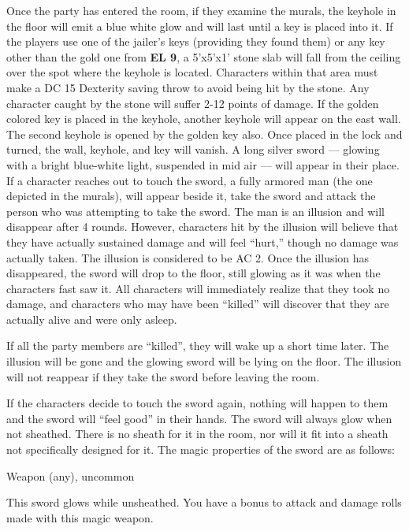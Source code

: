 \documentclass[palace_of_the_silver_princess]{subfiles}
\begin{document}
Once the party has entered the room, if they examine the murals, the
keyhole in the floor will emit a blue white glow and will last until a
key is placed into it. If the players use one of the jailer's keys
(providing they found them) or any key other than the gold one from
\textbf{EL 9}, a 5’x5’x1’ stone slab will fall from the ceiling over the
spot where the keyhole is located. Characters within that area must make
a DC 15 Dexterity saving throw to avoid being hit by the stone. Any
character caught by the stone will suffer 2-12 points of damage. If the
golden colored key is placed in the keyhole, another keyhole will appear
on the east wall. The second keyhole is opened by the golden key also.
Once placed in the lock and turned, the wall, keyhole, and key will
vanish. A long silver sword — glowing with a bright blue-white light,
suspended in mid air — will appear in their place. If a character
reaches out to touch the sword, a fully armored man (the one depicted in
the murals), will appear beside it, take the sword and attack the person
who was attempting to take the sword. The man is an illusion and will
disappear after 4 rounds. However, characters hit by the illusion will
believe that they have actually sustained damage and will feel “hurt,”
though no damage was actually taken. The illusion is considered to be AC
2. Once the illusion has disappeared, the sword will drop to the floor,
still glowing as it was when the characters fast saw it. All characters
will immediately realize that they took no damage, and characters who
may have been “killed” will discover that they are actually alive and
were only asleep.

If all the party members are “killed”, they will wake up a short time
later. The illusion will be gone and the glowing sword will be lying on
the floor. The illusion will not reappear if they take the sword before
leaving the room.

If the characters decide to touch the sword again, nothing will happen
to them and the sword will “feel good” in their hands. The sword will
always glow when not sheathed. There is no sheath for it in the room,
nor will it fit into a sheath not specifically designed for it. The
magic properties of the sword are as follows:

{Weapon (any), uncommon}

This sword glows while unsheathed.  You have a bonus to attack and damage rolls made with this magic weapon.
\end{document}
